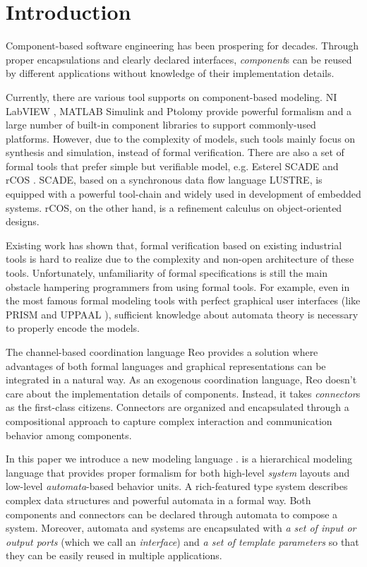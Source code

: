 \section{Introduction}
\label{sec:introduction}

Component-based software engineering has been prospering for decades. Through proper encapsulations and clearly declared interfaces, \emph{component}s can be reused by different applications without knowledge of their implementation details.

Currently, there are various tool supports on component-based modeling. NI LabVIEW \cite{labview}, MATLAB Simulink \cite{hahn2016essentialsimulink} and Ptolomy \cite{KimPtolomy2017} provide powerful formalism and a large number of built-in component libraries to support commonly-used platforms. However, due to the complexity of models, such tools mainly focus on synthesis and simulation, instead of formal verification.
There are also a set of formal tools that prefer simple but verifiable model, e.g. Esterel SCADE \cite{AbdullaISoLA2006} and rCOS \cite{LiuFsenRcos2010}. SCADE, based on a synchronous data flow language LUSTRE, is equipped with a powerful tool-chain and widely used in development of embedded systems. rCOS, on the other hand, is a refinement calculus on object-oriented designs.

Existing work \cite{ZouSimulinkHcsp2013} has shown that, formal verification based on existing industrial tools is hard to realize due to the complexity and non-open architecture of these tools. Unfortunately, unfamiliarity of formal specifications is still the main obstacle hampering programmers from using formal tools. For example, even in the most famous formal modeling tools with perfect graphical user interfaces (like PRISM \cite{KwiatkowskaCavPrism2011} and UPPAAL \cite{AmnellMovepUppaal2001}), sufficient knowledge about automata theory is necessary to properly encode the models.

The channel-based coordination language Reo \cite{ArbabMscsReo2004} provides a solution where advantages of both formal languages and graphical representations can be integrated in a natural way. As an exogenous coordination language, Reo doesn't care about the implementation details of components. Instead, it takes \emph{connector}s as the first-class citizens. Connectors are organized and encapsulated through a compositional approach to capture complex interaction and communication behavior among components.

In this paper we introduce a new modeling language \emlang{}. \lang{} is a hierarchical modeling language that provides proper formalism for both high-level \emph{system} layouts and low-level \emph{automata}-based behavior units. A rich-featured type system describes complex data structures and powerful automata in a formal way. Both components and connectors can be declared through automata to compose a system. Moreover, automata and systems are encapsulated with \emph{a set of input or output ports} (which we call an \emph{interface}) and \emph{a set of template parameters} so that they can be easily reused in multiple applications. 

